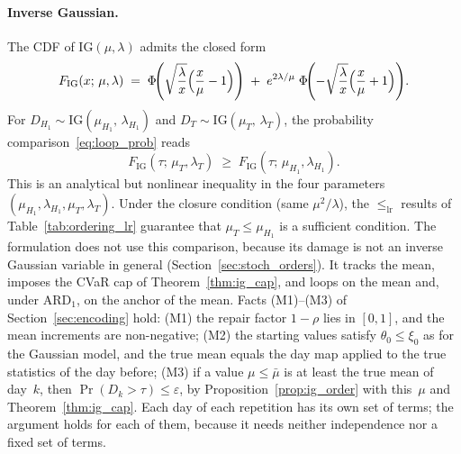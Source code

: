\documentclass[11pt,a4paper]{article}
\theoremstyle{plain}
\theoremstyle{definition}
\theoremstyle{remark}
\begin{document}
\paragraph{Inverse Gaussian.}
The CDF of $\mathrm{IG}(\mu,\lambda)$ admits the closed form
\begin{equation}\label{eq:ig_cdf}
  F_{\mathrm{IG}}(x;\,\mu,\lambda) \;=\;
    \Phi\!\Biggl(\sqrt{\frac{\lambda}{x}}\Bigl(\frac{x}{\mu}-1\Bigr)\Biggr)
    \;+\; e^{2\lambda/\mu}\;
    \Phi\!\Biggl(-\sqrt{\frac{\lambda}{x}}\Bigl(\frac{x}{\mu}+1\Bigr)\Biggr).
\end{equation}
For $D_{H_1} \sim \mathrm{IG}(\mu_{H_1},\,\lambda_{H_1})$ and $D_T \sim \mathrm{IG}(\mu_T,\,\lambda_T)$, the probability comparison~\eqref{eq:loop_prob} reads
\[
  F_{\mathrm{IG}}(\tau;\,\mu_T,\lambda_T) \;\ge\; F_{\mathrm{IG}}(\tau;\,\mu_{H_1},\lambda_{H_1}).
\]
This is an analytical but nonlinear inequality in the four parameters $(\mu_{H_1},\lambda_{H_1},\mu_T,\lambda_T)$.
Under the closure condition (same $\mu^2/\lambda$), the $\le_{\mathrm{lr}}$ results of Table~\ref{tab:ordering_lr} guarantee that $\mu_T \le \mu_{H_1}$ is a sufficient condition.
The formulation does not use this comparison, because its damage is not an inverse Gaussian variable in general (Section~\ref{sec:stoch_orders}).
It tracks the mean, imposes the CVaR cap of Theorem~\ref{thm:ig_cap}, and loops on the mean and, under $\text{ARD}_1$, on the anchor of the mean.
Facts (M1)--(M3) of Section~\ref{sec:encoding} hold: (M1) the repair factor $1-\rho$ lies in $[0, 1]$, and the mean increments are non-negative; (M2) the starting values satisfy $\theta_0 \le \xi_0$ as for the Gaussian model, and the true mean equals the day map applied to the true statistics of the day before; (M3) if a value $\mu \le \bar\mu$ is at least the true mean of day~$k$, then $\Pr(D_k > \tau) \le \varepsilon$, by Proposition~\ref{prop:ig_order} with this~$\mu$ and Theorem~\ref{thm:ig_cap}.
Each day of each repetition has its own set of terms; the argument holds for each of them, because it needs neither independence nor a fixed set of terms.
\end{document}
